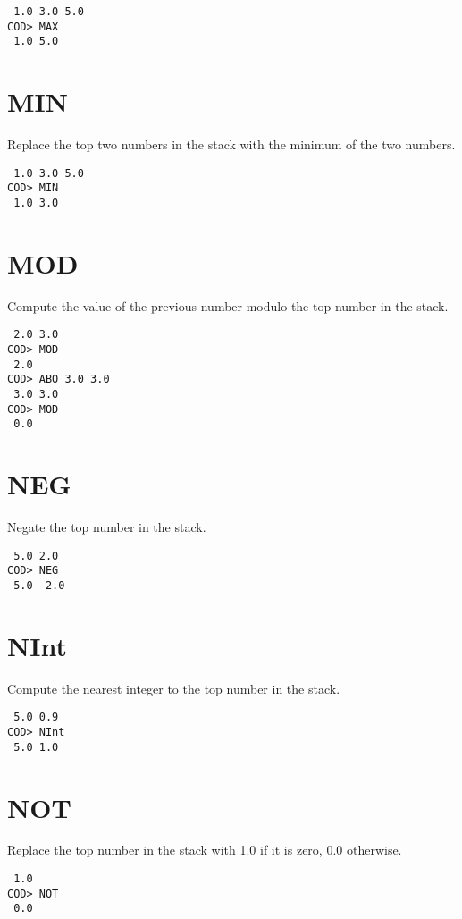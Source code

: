 \medskip
{}
\begin{verbatim}
 1.0 3.0 5.0
COD> MAX
 1.0 5.0
\end{verbatim}

\section*{MIN}
Replace the top two numbers in the stack with the minimum of the two numbers.

\medskip
{}
\begin{verbatim}
 1.0 3.0 5.0
COD> MIN
 1.0 3.0
\end{verbatim}

\section*{MOD}
Compute the value of the previous number modulo the top number in the stack.

\medskip
{}
\begin{verbatim}
 2.0 3.0
COD> MOD
 2.0
COD> ABO 3.0 3.0
 3.0 3.0
COD> MOD
 0.0
\end{verbatim}

\section*{NEG}
Negate the top number in the stack.

\medskip
{}
\begin{verbatim}
 5.0 2.0
COD> NEG
 5.0 -2.0
\end{verbatim}

\section*{NInt}
Compute the nearest integer to the top number in the stack.

\medskip
{}
\begin{verbatim}
 5.0 0.9
COD> NInt
 5.0 1.0
\end{verbatim}

\section*{NOT}
Replace the top number in the stack with 1.0 if it is zero,
0.0 otherwise.

\medskip
{}
\begin{verbatim}
 1.0
COD> NOT
 0.0
\end{verbatim}

